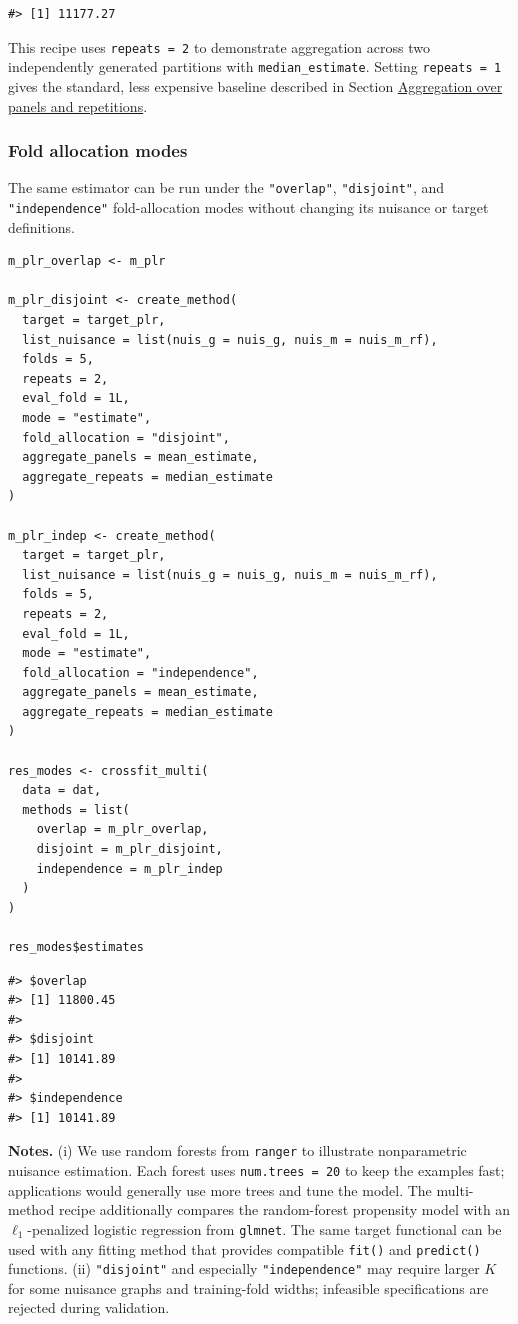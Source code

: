 \begin{verbatim}
#> [1] 11177.27
\end{verbatim}

This recipe uses \texttt{repeats\ =\ 2} to demonstrate aggregation across two independently generated partitions with \texttt{median\_estimate}. Setting \texttt{repeats\ =\ 1} gives the standard, less expensive baseline described in Section \hyperref[subsec:aggregation]{Aggregation over panels and repetitions}.

\subsubsection{Fold allocation modes}\label{fold-allocation-modes}

The same estimator can be run under the \texttt{"overlap"}, \texttt{"disjoint"}, and \texttt{"independence"} fold-allocation modes without changing its nuisance or target definitions.

\begin{verbatim}
m_plr_overlap <- m_plr

m_plr_disjoint <- create_method(
  target = target_plr,
  list_nuisance = list(nuis_g = nuis_g, nuis_m = nuis_m_rf),
  folds = 5,
  repeats = 2,
  eval_fold = 1L,
  mode = "estimate",
  fold_allocation = "disjoint",
  aggregate_panels = mean_estimate,
  aggregate_repeats = median_estimate
)

m_plr_indep <- create_method(
  target = target_plr,
  list_nuisance = list(nuis_g = nuis_g, nuis_m = nuis_m_rf),
  folds = 5,
  repeats = 2,
  eval_fold = 1L,
  mode = "estimate",
  fold_allocation = "independence",
  aggregate_panels = mean_estimate,
  aggregate_repeats = median_estimate
)

res_modes <- crossfit_multi(
  data = dat,
  methods = list(
    overlap = m_plr_overlap,
    disjoint = m_plr_disjoint,
    independence = m_plr_indep
  )
)

res_modes$estimates
\end{verbatim}

\begin{verbatim}
#> $overlap
#> [1] 11800.45
#> 
#> $disjoint
#> [1] 10141.89
#> 
#> $independence
#> [1] 10141.89
\end{verbatim}

\textbf{Notes.} (i) We use random forests from \texttt{ranger} to illustrate nonparametric nuisance estimation. Each forest uses \texttt{num.trees\ =\ 20} to keep the examples fast; applications would generally use more trees and tune the model. The multi-method recipe additionally compares the random-forest propensity model with an \(\ell_1\)-penalized logistic regression from \texttt{glmnet}. The same target functional can be used with any fitting method that provides compatible \texttt{fit()} and \texttt{predict()} functions. (ii) \texttt{"disjoint"} and especially \texttt{"independence"} may require larger \(K\) for some nuisance graphs and training-fold widths; infeasible specifications are rejected during validation.

